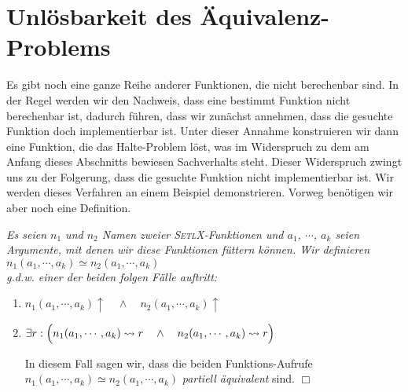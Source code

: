 \section{Unl\"osbarkeit des \"Aquivalenz-Problems}
Es gibt noch eine ganze Reihe anderer Funktionen, die nicht berechenbar sind.  In der
Regel werden wir den Nachweis, dass eine bestimmt Funktion nicht berechenbar ist, dadurch f\"uhren, dass
wir zun\"achst annehmen, dass die gesuchte Funktion doch implementierbar ist.  Unter dieser Annahme
konstruieren wir dann eine Funktion, die das Halte-Problem l\"ost, was im Widerspruch zu dem am Anfang dieses Abschnitts
bewiesen Sachverhalts steht.
Dieser Widerspruch zwingt uns zu der Folgerung, dass die gesuchte Funktion nicht implementierbar ist.
Wir werden dieses Verfahren an einem Beispiel demonstrieren. Vorweg ben\"otigen wir aber
noch eine Definition.

\begin{Definition}[$\simeq$] 
{\em 
Es seien $n_1$ und $n_2$ Namen zweier \textsc{SetlX}-Funktionen und
  $a_1$, $\cdots$, $a_k$ seien Argumente, mit denen wir diese Funktionen f\"uttern k\"onnen. Wir definieren \\[0.1cm]
\hspace*{1.3cm} $n_1(a_1,\cdots,a_k) \simeq n_2(a_1,\cdots,a_k)$ \\[0.1cm]
g.d.w. einer der beiden folgen F\"alle auftritt:
\begin{enumerate}
\item $n_1(a_1,\cdots,a_k)\uparrow \quad\wedge\quad n_2(a_1,\cdots,a_k)\uparrow$
\item $\exists r: \Bigl(n_1(a_1,\cdots,a_k) \leadsto r \quad\wedge\quad n_2(a_1,\cdots,a_k) \leadsto r\Bigr)$

      In diesem Fall sagen wir, dass die beiden Funktions-Aufrufe 
      $n_1(a_1,\cdots,a_k) \simeq n_2(a_1,\cdots,a_k)$ \emph{partiell \"aquivalent} sind.
      \hspace*{\fill} $\Box$
\end{enumerate}}
\end{Definition}

